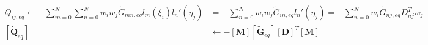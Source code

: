 \documentclass[10pt,a4paper]{article}
\begin{document}
\begin{equation}
\begin{split}
\dot{Q}_{ij,eq} \leftarrow -\sum_{m=0}^N \sum_{n=0}^N	 w_i w_j \tilde{G}_{mn,eq}l_m(\xi_i)l_n'(\eta_j) &= -\sum_{n=0}^N	 w_i w_j \tilde{G}_{in,eq}l_n'(\eta_j) =  -\sum_{n=0}^N w_i \tilde{G}_{nj,eq} D_{nj}^T w_j  \\
[\dot{\boldsymbol{Q}}_{eq}] &\leftarrow -[\boldsymbol{M}] [\boldsymbol{\tilde{G}}_{eq}] [\boldsymbol{D}]^T [\boldsymbol{M}]
\end{split}
\end{equation}
\end{document}
